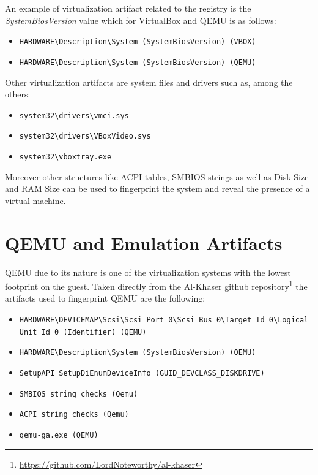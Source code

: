 An example of virtualization artifact related to the registry is the \textit{SystemBiosVersion} value which for VirtualBox and QEMU is as follows:
\begin{itemize}
    \item \lstinline{HARDWARE\Description\System (SystemBiosVersion) (VBOX)}
    \item \lstinline{HARDWARE\Description\System (SystemBiosVersion) (QEMU)} 
\end{itemize}

Other virtualization artifacts are system files and drivers such as, among the others:
\begin{itemize}
    \item \lstinline{system32\drivers\vmci.sys}
    \item \lstinline{system32\drivers\VBoxVideo.sys}
    \item \lstinline{system32\vboxtray.exe}
\end{itemize}

Moreover other structures like ACPI tables, SMBIOS strings as well as Disk Size and RAM Size can be used to fingerprint the system and reveal the presence of a virtual machine. 


\section{QEMU and Emulation Artifacts}

QEMU due to its nature is one of the virtualization systems with the lowest footprint on the guest. Taken directly from the Al-Khaser github repository\footnote{\url{https://github.com/LordNoteworthy/al-khaser}} the artifacts used to fingerprint QEMU are the following:

\begin{itemize}
    \item \lstinline{HARDWARE\DEVICEMAP\Scsi\Scsi Port 0\Scsi Bus 0\Target Id 0\Logical Unit Id 0 (Identifier) (QEMU)}
    \item \lstinline{HARDWARE\Description\System (SystemBiosVersion) (QEMU)}
    \item \lstinline{SetupAPI SetupDiEnumDeviceInfo (GUID_DEVCLASS_DISKDRIVE)}
    \item \lstinline{SMBIOS string checks (Qemu)}
    \item \lstinline{ACPI string checks (Qemu)}
    \item \lstinline{qemu-ga.exe (QEMU)}
\end{itemize}

